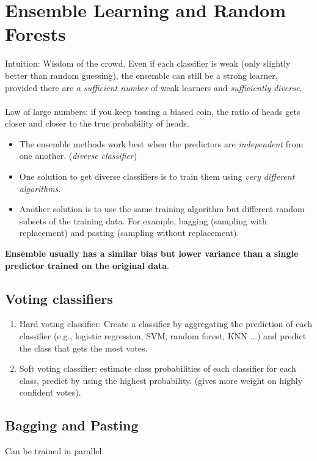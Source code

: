 \documentclass[12pt,oneside,a4paper]{article}
\numberwithin{equation}{section}
\begin{document}
\section{Ensemble Learning and Random Forests}

Intuition: Wisdom of the crowd. Even if each classifier is weak (only slightly better than random guessing), the ensemble can still be a strong learner, provided there are \emph{a sufficient number} of weak learners and \emph{sufficiently diverse}.\\~\\
Law of large numbers: if you keep tossing a biased coin, the ratio of heads gets closer and closer to the true probability of heads.

 \begin{itemize}
 	\item The ensemble methods work best when the predictors are \emph{independent} from one another. (\emph{diverse classifier})
 	
 	\item One solution to get diverse classifiers is to train them using \emph{very different algorithms}.
 	
 	\item Another solution is to use the same training algorithm but different random subsets of the training data. For example, bagging (sampling with replacement) and pasting (sampling without replacement).
 \end{itemize}

\textbf{Ensemble usually has a similar bias but lower variance than a single predictor trained on the original data}.
\subsection{Voting classifiers}
\begin{enumerate}
\item Hard voting classifier: Create a classifier by aggregating the prediction of each classifier (e.g., logistic regression, SVM, random forest, KNN ...) and predict the class that gets the most votes.


\item Soft voting classifier: estimate class probabilities of each classifier for each class, predict by using the highest probability. (gives more weight on highly confident votes).
\end{enumerate}
\subsection{Bagging and Pasting}
Can be trained in parallel.
\end{document}
